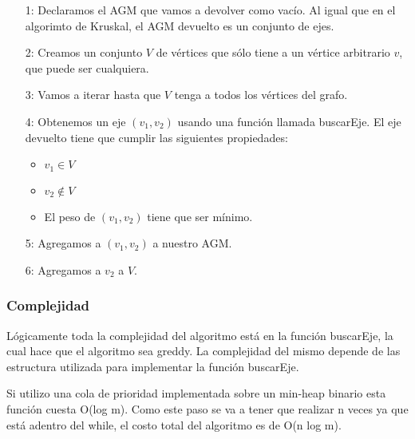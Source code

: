 \begin{enumerate}
\item [1:] Declaramos el AGM que vamos a devolver como vac\'io. Al igual que en el algorimto de Kruskal, el AGM devuelto es un conjunto de ejes.
\item [2:] Creamos un conjunto $V$ de v\'ertices que s\'olo tiene a un v\'ertice arbitrario $v$, que puede ser cualquiera.
\item [3:] Vamos a iterar hasta que $V$ tenga a todos los v\'ertices del grafo.
\item [4:] Obtenemos un eje $(v_1, v_2)$ usando una funci\'on llamada buscarEje. El eje devuelto tiene que cumplir las siguientes propiedades:
  \begin{itemize}
  \item $v_1 \in V$
  \item $v_2 \not \in V$
  \item El peso de $(v_1, v_2)$ tiene que ser m\'inimo.
  \end{itemize}
\item [5:] Agregamos a $(v_1, v_2)$ a nuestro AGM.
\item [6:] Agregamos a $v_2$ a $V$.
\end{enumerate}

\subsubsection*{Complejidad}

L\'ogicamente toda la complejidad del algoritmo est\'a en la funci\'on buscarEje, la cual hace que el algoritmo sea greddy. La complejidad del mismo depende de las estructura utilizada para implementar la funci\'on buscarEje.

Si utilizo una cola de prioridad implementada sobre un min-heap binario esta funci\'on cuesta O(log m). Como este paso se va a tener que realizar n veces ya que est\'a adentro del while, el costo total del algoritmo es de O(n log m).